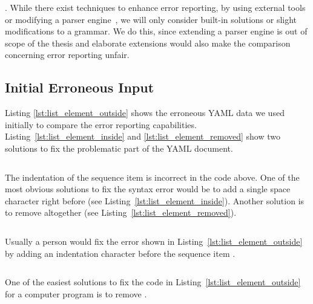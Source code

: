 . While there exist techniques to enhance error reporting, by using external tools or modifying a parser engine~\cite{jeffery2003generating, cox2010errors}, we will only consider built-in solutions or slight modifications to a grammar. We do this, since extending a parser engine is out of scope of the thesis and elaborate extensions would also make the comparison concerning error reporting unfair.

\subsection{Initial Erroneous Input}

Listing \ref{lst:list_element_outside} shows the erroneous YAML data we used initially to compare the error reporting capabilities. Listing~\ref{lst:list_element_inside} and \ref{lst:list_element_removed} show two solutions to fix the problematic part of the YAML document.

\begin{listing}
  \begin{code-boxed}
    \inputminted[linenos]{yaml}{Data/Errors/list_element_outside.yaml}
  \end{code-boxed}
  \caption{The indentation of the sequence item  is incorrect in the code above. One of the most obvious solutions to fix the syntax error would be to add a single space character right before  (see Listing~\ref{lst:list_element_inside}). Another solution is to remove  altogether (see Listing~\ref{lst:list_element_removed}).}
  \label{lst:list_element_outside}
\end{listing}

\begin{listing}
  \begin{code-boxed}
    \inputminted[linenos]{yaml}{Data/Correct/list_element_inside.yaml}
  \end{code-boxed}
  \caption{Usually a person would fix the error shown in Listing~\ref{lst:list_element_outside} by adding an indentation character before the sequence item .}
  \label{lst:list_element_inside}
\end{listing}

\begin{listing}
  \begin{code-boxed}
    \inputminted[linenos]{yaml}{Data/Correct/list_element_removed.yaml}
  \end{code-boxed}
  \caption{One of the easiest solutions to fix the code in Listing~\ref{lst:list_element_outside} for a computer program is to remove .}
  \label{lst:list_element_removed}
\end{listing}

